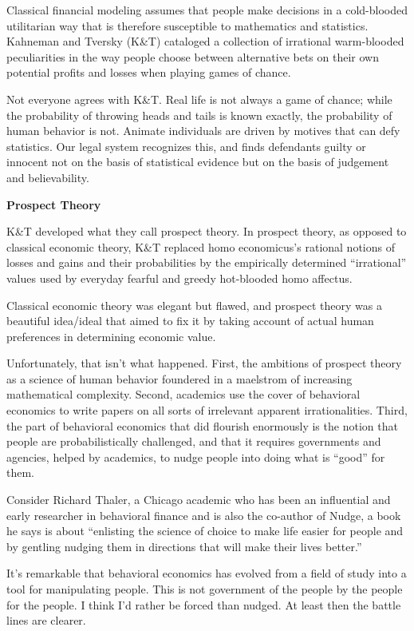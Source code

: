 \documentclass[
]{book}
\begin{document}
Classical financial modeling assumes that people make decisions in a cold-blooded utilitarian way
that is therefore susceptible to mathematics and statistics. Kahneman and Tversky (K\&T) cataloged
a collection of irrational warm-blooded peculiarities in the way people choose between alternative
bets on their own potential profits and losses when playing games of chance.

Not everyone agrees with K\&T. Real life is not always a game of chance; while the probability of
throwing heads and tails is known exactly, the probability of human behavior is not.
Animate
individuals are driven by motives that can defy statistics. Our legal system recognizes this, and finds
defendants guilty or innocent not on the basis of statistical evidence but on the basis of judgement
and believability.

\textbf{Prospect Theory}

K\&T developed what they call prospect theory. In
prospect theory, as opposed to classical economic theory, K\&T replaced homo economicus's rational
notions of losses and gains and their probabilities by the empirically determined ``irrational'' values
used by everyday fearful and greedy hot-blooded homo affectus.

Classical economic theory was elegant but flawed, and prospect theory was a beautiful idea/ideal
that aimed to fix it by taking account of actual human preferences in determining economic value.

Unfortunately, that isn't what happened. First, the ambitions of prospect theory as a science of
human behavior foundered in a maelstrom of increasing mathematical complexity. Second,
academics use the cover of behavioral economics to write papers on all sorts of irrelevant apparent
irrationalities. Third, the part of behavioral economics that did flourish enormously is the notion
that people are probabilistically challenged, and that it requires governments and agencies, helped
by academics, to nudge people into doing what is ``good'' for them.

Consider Richard Thaler, a Chicago academic who has been an influential and
early researcher in behavioral finance and is also the co-author of Nudge, a book he says is about
``enlisting the science of choice to make life easier for people and by gentling nudging them in
directions that will make their lives better.''

It's remarkable that behavioral economics has evolved from a field of study into a tool for
manipulating people.
This is not government of the people by the people for the people. I think I'd rather be forced than
nudged. At least then the battle lines are clearer.
\end{document}
